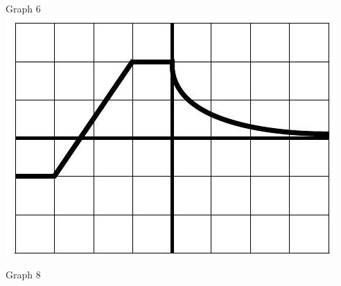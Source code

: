 \documentclass[10pt]{article}
\begin{document}
Graph 6\\
\includegraphics[max width=\textwidth, center]{2024_12_26_08a12fb3da5425a27925g-5(3)}

Graph 8
\end{document}
